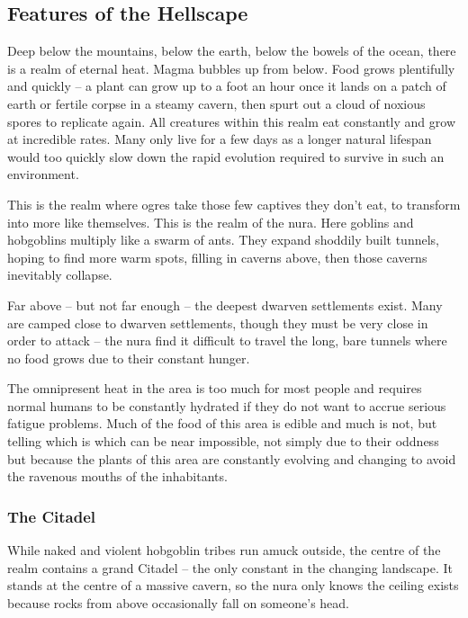 \begin{multicols}{2}

\subsection{Features of the Hellscape}

Deep below the mountains, below the earth, below the bowels of the ocean, there is a realm of eternal heat.
Magma bubbles up from below.
Food grows plentifully and quickly -- a plant can grow up to a foot an hour once it lands on a patch of earth or fertile corpse in a steamy cavern, then spurt out a cloud of noxious spores to replicate again.
All creatures within this realm eat constantly and grow at incredible rates.
Many only live for a few days as a longer natural lifespan would too quickly slow down the rapid evolution required to survive in such an environment.

This is the realm where ogres take those few captives they don't eat, to transform into more like themselves.
This is the realm of the nura.
Here goblins and hobgoblins multiply like a swarm of ants.
They expand shoddily built tunnels, hoping to find more warm spots, filling in caverns above, then those caverns inevitably collapse.

Far above -- but not far enough -- the deepest dwarven settlements exist.
Many are camped close to dwarven settlements, though they must be very close in order to attack -- the nura find it difficult to travel the long, bare tunnels where no food grows due to their constant hunger.

The omnipresent heat in the area is too much for most people and requires normal humans to be constantly hydrated if they do not want to accrue serious fatigue problems.
  Much of the food of this area is edible and much is not, but telling which is which can be near impossible, not simply due to their oddness but because the plants of this area are constantly evolving and changing to avoid the ravenous mouths of the inhabitants.


\subsubsection{The Citadel}

While naked and violent hobgoblin tribes run amuck outside, the centre of the realm contains a grand Citadel -- the only constant in the changing landscape.
It stands at the centre of a massive cavern, so the nura only knows the ceiling exists because rocks from above occasionally fall on someone's head.


\end{multicols}
